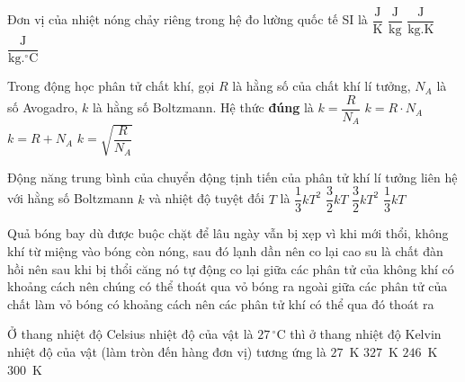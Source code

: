 	\begin{ex}%
		Đơn vị của nhiệt nóng chảy riêng trong hệ đo lường quốc tế SI là
		\choice
		{$\dfrac{\text{J}}{\text{K}}$}
		{\True $\dfrac{\text{J}}{\text{kg}}$}
		{$\dfrac{\text{J}}{\text{kg.K}}$}
		{$\dfrac{\text{J}}{\text{kg}.^\circ\text{C}}$}
	\end{ex}

	\begin{ex}%
		Trong động học phân tử chất khí, gọi $R$ là hằng số của chất khí lí tưởng, $N_A$ là số Avogadro, $k$ là hằng số Boltzmann. Hệ thức \textbf{đúng} là
		\choice
		{\True $k=\dfrac{R}{N_A}$}
		{$k=R\cdot N_A$}
		{$k=R+N_A$}
		{$k=\sqrt{\dfrac{R}{N_A}}$}
	\end{ex}

	\begin{ex}%
		Động năng trung bình của chuyển động tịnh tiến của phân tử khí lí tưởng liên hệ với hằng số Boltzmann $k$ và nhiệt độ tuyệt đối $T$ là
		\choice
		{$\dfrac{1}{3}kT^2$}
		{\True $\dfrac{3}{2}kT$}
		{$\dfrac{3}{2}kT^2$}
		{$\dfrac{1}{3}kT$}
	\end{ex}

	\begin{ex}%
		Quả bóng bay dù được buộc chặt để lâu ngày vẫn bị xẹp vì
		\choice
		{khi mới thổi, không khí từ miệng vào bóng còn nóng, sau đó lạnh dần nên co lại}
		{cao su là chất đàn hồi nên sau khi bị thổi căng nó tự động co lại}
		{giữa các phân tử của không khí có khoảng cách nên chúng có thể thoát qua vỏ bóng ra ngoài}
		{\True giữa các phân tử của chất làm vỏ bóng có khoảng cách nên các phân tử khí có thể qua đó thoát ra}
	\end{ex}

	\begin{ex}%
		Ở thang nhiệt độ Celsius nhiệt độ của vật là $27\,^\circ\text{C}$ thì ở thang nhiệt độ Kelvin nhiệt độ của vật (làm tròn đến hàng đơn vị) tương ứng là
		\choice
		{$27$~K}
		{$327$~K}
		{$246$~K}
		{\True $300$~K}
	\end{ex}

